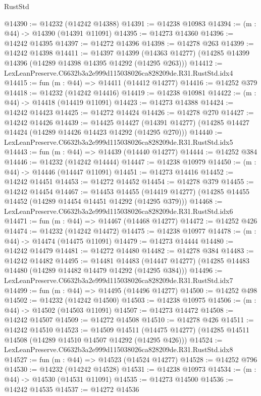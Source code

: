 \begin{lexlean}{RustStd}
\begin{coremodule}
@14390 := @14232 (@14242 @14388)
@14391 := @14238 @10983
@14394 := (m : @44) -> @14390 (@14391 @11091)
@14395 := @14273 @14360
@14396 := @14242 @14395
@14397 := @14272 @14396
@14398 := @14278 @263
@14399 := @14242 @14398
@14411 := @14397
    @14399
    (@14363 @14277)
    (@14285 @14399 @14396 (@14289 @14398 @14395 @14292 (@14295 @263)))
@14412 := LexLeanPreserve.C6632b3a2e999d115038026ca828209de.R31.RustStd.idx4
@14415 := fun (m : @44) => @14411 (@14412 @14277)
@14416 := @14252 @379
@14418 := @14232 (@14242 @14416)
@14419 := @14238 @10981
@14422 := (m : @44) -> @14418 (@14419 @11091)
@14423 := @14273 @14388
@14424 := @14242 @14423
@14425 := @14272 @14424
@14426 := @14278 @270
@14427 := @14242 @14426
@14439 := @14425
    @14427
    (@14391 @14277)
    (@14285 @14427 @14424 (@14289 @14426 @14423 @14292 (@14295 @270)))
@14440 := LexLeanPreserve.C6632b3a2e999d115038026ca828209de.R31.RustStd.idx5
@14443 := fun (m : @44) => @14439 (@14440 @14277)
@14444 := @14252 @384
@14446 := @14232 (@14242 @14444)
@14447 := @14238 @10979
@14450 := (m : @44) -> @14446 (@14447 @11091)
@14451 := @14273 @14416
@14452 := @14242 @14451
@14453 := @14272 @14452
@14454 := @14278 @379
@14455 := @14242 @14454
@14467 := @14453
    @14455
    (@14419 @14277)
    (@14285 @14455 @14452 (@14289 @14454 @14451 @14292 (@14295 @379)))
@14468 := LexLeanPreserve.C6632b3a2e999d115038026ca828209de.R31.RustStd.idx6
@14471 := fun (m : @44) => @14467 (@14468 @14277)
@14472 := @14252 @426
@14474 := @14232 (@14242 @14472)
@14475 := @14238 @10977
@14478 := (m : @44) -> @14474 (@14475 @11091)
@14479 := @14273 @14444
@14480 := @14242 @14479
@14481 := @14272 @14480
@14482 := @14278 @384
@14483 := @14242 @14482
@14495 := @14481
    @14483
    (@14447 @14277)
    (@14285 @14483 @14480 (@14289 @14482 @14479 @14292 (@14295 @384)))
@14496 := LexLeanPreserve.C6632b3a2e999d115038026ca828209de.R31.RustStd.idx7
@14499 := fun (m : @44) => @14495 (@14496 @14277)
@14500 := @14252 @498
@14502 := @14232 (@14242 @14500)
@14503 := @14238 @10975
@14506 := (m : @44) -> @14502 (@14503 @11091)
@14507 := @14273 @14472
@14508 := @14242 @14507
@14509 := @14272 @14508
@14510 := @14278 @426
@14511 := @14242 @14510
@14523 := @14509
    @14511
    (@14475 @14277)
    (@14285 @14511 @14508 (@14289 @14510 @14507 @14292 (@14295 @426)))
@14524 := LexLeanPreserve.C6632b3a2e999d115038026ca828209de.R31.RustStd.idx8
@14527 := fun (m : @44) => @14523 (@14524 @14277)
@14528 := @14252 @796
@14530 := @14232 (@14242 @14528)
@14531 := @14238 @10973
@14534 := (m : @44) -> @14530 (@14531 @11091)
@14535 := @14273 @14500
@14536 := @14242 @14535
@14537 := @14272 @14536

\end{coremodule}
\end{lexlean}
